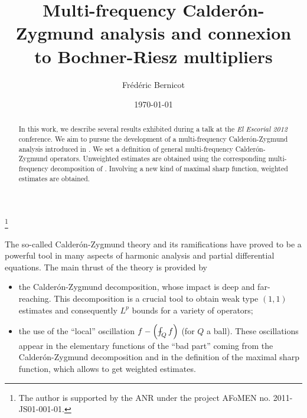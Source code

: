 \documentclass[11pt]{amsart}
\theoremstyle{remark}
\def\Xint#1{\mathchoice
   {\XXint\displaystyle\textstyle{#1}}%
   {\XXint\textstyle\scriptstyle{#1}}%
   {\XXint\scriptstyle\scriptscriptstyle{#1}}%
   {\XXint\scriptscriptstyle\scriptscriptstyle{#1}}%
   \!\int}
\def\XXint#1#2#3{{\setbox0=\hbox{$#1{#2#3}{\int}$}
     \vcenter{\hbox{$#2#3$}}\kern-.5\wd0}}
\def\aver#1{\Xint-_{#1}}
\begin{document}


\thanks{The author is supported by the ANR under the project AFoMEN no. 2011-JS01-001-01.}

\author{Fr\'ed\'eric Bernicot}
\address{Fr\'ed\'eric Bernicot, Laboratoire de Math\'ematiques Jean Leray \\ 2, Rue de la Houssini\`ere F-44322 Nantes Cedex 03, France.} 

\title[Multi-frequency analysis]{Multi-frequency Calder\'on-Zygmund analysis and connexion to Bochner-Riesz multipliers}


  
\date{\today}


\begin{abstract} In this work, we describe several results exhibited during a talk at the {\it El Escorial 2012} conference.
We aim to pursue the development of a multi-frequency Calder\'on-Zygmund analysis introduced in \cite{NOT}. We set a definition of general multi-frequency Calder\'on-Zygmund operators. Unweighted estimates are obtained using the corresponding multi-frequency decomposition of \cite{NOT}. Involving a new kind of maximal sharp function, weighted estimates are obtained. 
\end{abstract}

\maketitle

The so-called Calder\'on-Zygmund theory and its ramifications have proved to be a powerful tool in many aspects of harmonic analysis and partial differential equations.
The main thrust of the theory is provided by 
\begin{itemize} 
 \item the Calder\'on-Zygmund decomposition, whose impact is deep and far-reaching. This decomposition is a crucial tool
to obtain weak type $(1,1)$ estimates and consequently $L^p$ bounds for a variety of operators;
 \item the use of the ``local'' oscillation $f - \left( \aver{Q}f \right)$ (for $Q$ a ball). These oscillations appear in the elementary functions of the ``bad part'' coming from the Calder\'on-Zygmund decomposition and in the definition of the maximal sharp function, which allows to get weighted estimates.
\end{itemize}
\end{document}
